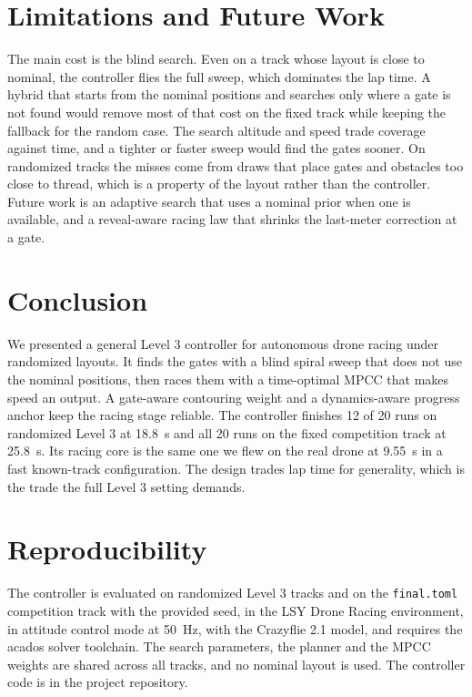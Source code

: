 \documentclass[conference]{IEEEtran}
\begin{document}
\section{Limitations and Future Work}
\label{sec:limits}
The main cost is the blind search. Even on a track whose layout is close to nominal, the controller flies the full sweep, which dominates the lap time. A hybrid that starts from the nominal positions and searches only where a gate is not found would remove most of that cost on the fixed track while keeping the fallback for the random case. The search altitude and speed trade coverage against time, and a tighter or faster sweep would find the gates sooner. On randomized tracks the misses come from draws that place gates and obstacles too close to thread, which is a property of the layout rather than the controller. Future work is an adaptive search that uses a nominal prior when one is available, and a reveal-aware racing law that shrinks the last-meter correction at a gate.

\section{Conclusion}
We presented a general Level 3 controller for autonomous drone racing under randomized layouts. It finds the gates with a blind spiral sweep that does not use the nominal positions, then races them with a time-optimal MPCC that makes speed an output. A gate-aware contouring weight and a dynamics-aware progress anchor keep the racing stage reliable. The controller finishes 12 of 20 runs on randomized Level 3 at 18.8~s and all 20 runs on the fixed competition track at 25.8~s. Its racing core is the same one we flew on the real drone at 9.55~s in a fast known-track configuration. The design trades lap time for generality, which is the trade the full Level 3 setting demands.

\appendices
\section{Reproducibility}
The controller is evaluated on randomized Level 3 tracks and on the \texttt{final.toml} competition track with the provided seed, in the LSY Drone Racing environment, in attitude control mode at 50~Hz, with the Crazyflie 2.1 model, and requires the acados solver toolchain. The search parameters, the planner and the MPCC weights are shared across all tracks, and no nominal layout is used. The controller code is in the project repository.
\end{document}
